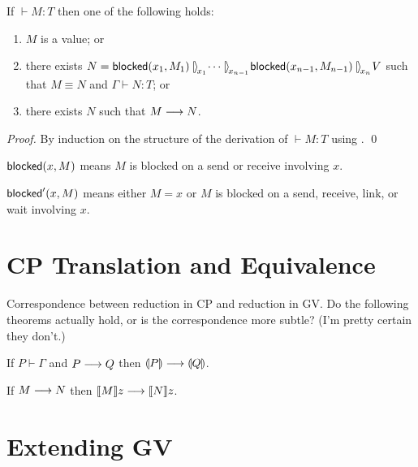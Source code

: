 \documentclass[orivec,envcountsame]{llncs}
\begin{document}
\begin{theorem}
If $\vdash M : T$ then one of the following holds:
\begin{enumerate}
\item $M$ is a value; or
\item there exists $N = \blockedp(x_1, M_1) \rpar{x_1} \dots \rpar{x_{n-1}} \blockedp(x_{n-1},
  M_{n-1}) \rpar{x_n} V$ such that $M \equiv N$ and $\Gamma \vdash N : T$; or
\item there exists $N$ such that $M \longrightarrow N$.
\end{enumerate}
\end{theorem}
%
\begin{proof}
By induction on the structure of the derivation of $\vdash M : T$ using
. \qed
\end{proof}

$\mathsf{blocked}(x, M)$ means $M$ is blocked on a send or receive involving $x$.

$\mathsf{blocked}'(x, M)$ means either $M = x$ or $M$ is blocked on a send, receive, link, or wait
involving $x$.

\section{CP Translation and Equivalence}


Correspondence between reduction in CP and reduction in GV. Do the following theorems actually hold,
or is the correspondence more subtle? (I'm pretty certain they don't.)

\begin{theorem}
If $P \vdash \Gamma$ and $P \longrightarrow Q$ then $\llparenthesis P \rrparenthesis \longrightarrow \llparenthesis Q \rrparenthesis$.
\end{theorem}

\begin{theorem}
If $M \longrightarrow N$ then $\llbracket M \rrbracket z \longrightarrow \llbracket N \rrbracket z$.
\end{theorem}

\section{Extending GV}
\end{document}
